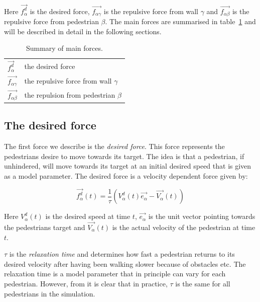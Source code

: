 Here $\overrightarrow{f_{\alpha}^{d}}$ is the desired force, 
$\overrightarrow{f_{\alpha \gamma}}$ is the repulsive force from wall $\gamma$ 
and $\overrightarrow{f_{\alpha \beta}}$ is the repulsive force from pedestrian 
$\beta$. The main forces are summarised in table~\ref{tbl:main-forces} and 
will be described in detail in the following sections.

\begin{table}[h]
    \centering
    \begin{tabular}{l l}
        \toprule
        $\overrightarrow{f_{\alpha}^{d}}$ & the desired force\\
        $\overrightarrow{f_{\alpha \gamma}}$ & the repulsive force from wall 
        $\gamma$\\
        $\overrightarrow{f_{\alpha \beta}}$ & the repulsion from pedestrian 
        $\beta$\\
        \bottomrule
    \end{tabular}
    \caption{Summary of main forces.}
    \label{tbl:main-forces}
\end{table}

\subsection{The desired force}
\label{sec:desired-force}
The first force we describe is the \emph{desired force}. This force represents 
the pedestrians desire to move towards its target. The idea is that a 
pedestrian, if unhindered, will move towards its target at an initial desired 
speed that is given as a model parameter. The desired force is a velocity 
dependent force given by:

\begin{equation}\label{relaxtime}
	\overrightarrow{f^{d}_{\alpha}} (t) =
    \frac{1}{\tau}
    \left( V_{\alpha}^{d}(t) \overrightarrow{e_{\alpha}} - 
    \overrightarrow{V_{\alpha}}(t) \right)
\end{equation}

Here $V_{\alpha}^{d}(t)$ is the desired speed at time $t$, $\overrightarrow{e_{\alpha}}$ is 
the unit vector pointing towards the pedestrians target and  
$\overrightarrow{V_{\alpha}}(t)$ is the actual velocity of the pedestrian at 
time $t$.

$\tau$ is the \emph{relaxation time} and determines how fast a pedestrian 
returns to its desired velocity after having been walking slower because of 
obstacles etc. The relaxation time is a model parameter that in principle can vary 
for each pedestrian. However, from \cite{self-org} it is clear that in 
practice, $\tau$ is the same for all pedestrians in the simulation.

